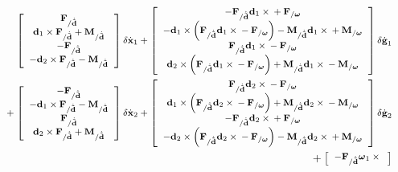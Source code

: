 \documentclass[10pt,dvips,fleqn,subeqn]{report}
\newcommand{\T}[1]{\bm{\mathbf{#1}}}
\begin{document}
\begin{align}
	\footnotesize
	\sqbr{\matr{c}{
		\T{F}_{/\dot{\tilde{\T{d}}}} \\
		\T{d}_1 \times \T{F}_{/\dot{\tilde{\T{d}}}}
			+ \T{M}_{/\dot{\tilde{\T{d}}}} \\
		- \T{F}_{/\dot{\tilde{\T{d}}}} \\
		- \T{d}_2 \times \T{F}_{/\dot{\tilde{\T{d}}}}
			- \T{M}_{/\dot{\tilde{\T{d}}}}
	}} \delta\dot{\T{x}}_1
%
	+ \sqbr{\matr{c}{
		-\T{F}_{/\dot{\tilde{\T{d}}}} \T{d}_1\times{}
			+ \T{F}_{/\T{\omega}} \\
		- \T{d}_1 \times \plbr{
			\T{F}_{/\dot{\tilde{\T{d}}}} \T{d}_1\times{}
			- \T{F}_{/\T{\omega}}
		}
			- \T{M}_{/\dot{\tilde{\T{d}}}} \T{d}_1\times{}
			+ \T{M}_{/\T{\omega}} \\
		\T{F}_{/\dot{\tilde{\T{d}}}} \T{d}_1\times{}
			- \T{F}_{/\T{\omega}} \\
		\T{d}_2 \times \plbr{
			\T{F}_{/\dot{\tilde{\T{d}}}} \T{d}_1\times{}
			- \T{F}_{/\T{\omega}}
		}
			+ \T{M}_{/\dot{\tilde{\T{d}}}} \T{d}_1\times{}
			- \T{M}_{/\T{\omega}}
	}} \delta\dot{\T{g}}_1
	& \nonumber \\
%
	\footnotesize
	\mbox{}
	+ \sqbr{\matr{c}{
		- \T{F}_{/\dot{\tilde{\T{d}}}} \\
		- \T{d}_1 \times \T{F}_{/\dot{\tilde{\T{d}}}}
			- \T{M}_{/\dot{\tilde{\T{d}}}} \\
		\T{F}_{/\dot{\tilde{\T{d}}}} \\
		\T{d}_2 \times \T{F}_{/\dot{\tilde{\T{d}}}}
			+ \T{M}_{/\dot{\tilde{\T{d}}}}
	}} \delta\dot{\T{x}}_2
%
	+ \sqbr{\matr{c}{
		\T{F}_{/\dot{\tilde{\T{d}}}} \T{d}_2\times{}
			- \T{F}_{/\T{\omega}} \\
		\T{d}_1 \times \plbr{
			\T{F}_{/\dot{\tilde{\T{d}}}} \T{d}_2\times{}
			- \T{F}_{/\T{\omega}}
		}
			+ \T{M}_{/\dot{\tilde{\T{d}}}} \T{d}_2\times{}
			- \T{M}_{/\T{\omega}} \\
		- \T{F}_{/\dot{\tilde{\T{d}}}} \T{d}_2\times{}
			+ \T{F}_{/\T{\omega}} \\
		- \T{d}_2 \times \plbr{
			\T{F}_{/\dot{\tilde{\T{d}}}} \T{d}_2\times{}
			- \T{F}_{/\T{\omega}}
		}
			- \T{M}_{/\dot{\tilde{\T{d}}}} \T{d}_2\times{}
			+ \T{M}_{/\T{\omega}}
	}} \delta\dot{\T{g}}_2
	& \nonumber \\
%
%
%
	\footnotesize
	\mbox{} + \sqbr{\cvvect{
		- \T{F}_{/\dot{\tilde{\T{d}}}} \T{\omega}_1 \times{} \\
}}
\end{align}
\end{document}
